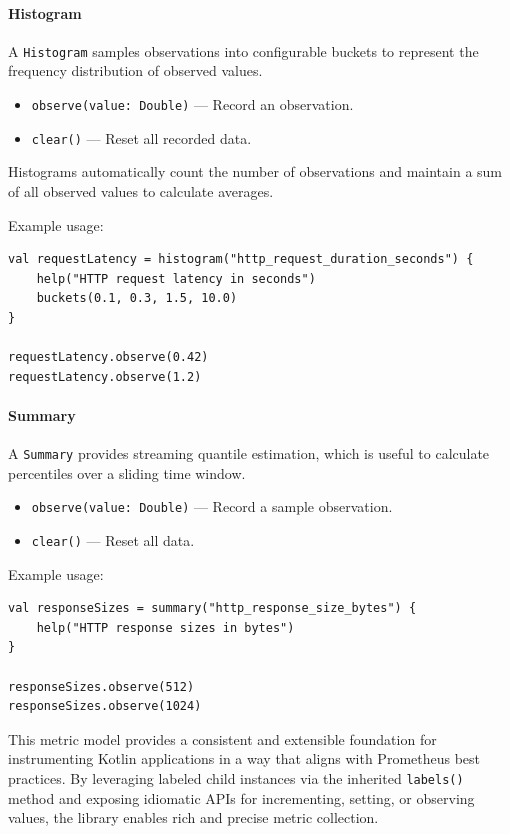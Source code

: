 \paragraph{Histogram}

A \texttt{Histogram} samples observations into configurable buckets to represent the frequency distribution of observed values.

\begin{itemize}
    \item \texttt{observe(value: Double)} — Record an observation.
    \item \texttt{clear()} — Reset all recorded data.
\end{itemize}

Histograms automatically count the number of observations and maintain a sum of all observed values to calculate averages.

Example usage:

\begin{lstlisting}
val requestLatency = histogram("http_request_duration_seconds") {
    help("HTTP request latency in seconds")
    buckets(0.1, 0.3, 1.5, 10.0)
}

requestLatency.observe(0.42)
requestLatency.observe(1.2)
\end{lstlisting}

\paragraph{Summary}

A \texttt{Summary} provides streaming quantile estimation, which is useful to calculate percentiles over a sliding time window.

\begin{itemize}
    \item \texttt{observe(value: Double)} — Record a sample observation.
    \item \texttt{clear()} — Reset all data.
\end{itemize}

Example usage:

\begin{lstlisting}
val responseSizes = summary("http_response_size_bytes") {
    help("HTTP response sizes in bytes")
}

responseSizes.observe(512)
responseSizes.observe(1024)
\end{lstlisting}

This metric model provides a consistent and extensible foundation for instrumenting Kotlin applications in a way that aligns with Prometheus best practices.
By leveraging labeled child instances via the inherited \texttt{labels()} method and exposing idiomatic APIs for incrementing, setting, or observing values, the library enables rich and precise metric collection.

